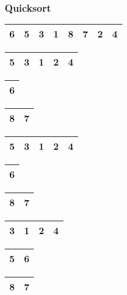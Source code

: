 \begin{frame}
\frametitle{Quicksort}
\begin{table}
\begin{tabular}{| c | c | c | c | c | c | c | c |}
\hline
\cellcolor{red!25}6 & 5 & 3 & 1 & 8 & 7 & 2 & 4 \\ 
\hline
\end{tabular}
\end{table}

\begin{table}
\begin{tabular}{| c | c | c | c | c |}
\hline
5 & 3 & 1 & 2 & 4 \\ 
\hline
\end{tabular}
\quad
\begin{tabular}{| c |}
\hline
\cellcolor{blue!25}6\\ 
\hline
\end{tabular}
\quad
\begin{tabular}{| c | c |}
\hline
8 & 7 \\ 
\hline
\end{tabular}
\end{table}

\begin{table}
\begin{tabular}{| c | c | c | c | c |}
\hline
\cellcolor{red!25}5 & 3 & 1 & 2 & 4 \\ 
\hline
\end{tabular}
\quad
\begin{tabular}{| c |}
\hline
\cellcolor{blue!25}6\\ 
\hline
\end{tabular}
\quad
\begin{tabular}{| c | c |}
\hline
8 & 7 \\ 
\hline
\end{tabular}
\end{table}

\begin{table}
\begin{tabular}{| c | c | c | c |}
\hline
3 & 1 & 2 & 4 \\ 
\hline
\end{tabular}
\quad
\begin{tabular}{| c | c |}
\hline
\cellcolor{blue!25}5 & \cellcolor{blue!25}6\\ 
\hline
\end{tabular}
\quad
\begin{tabular}{| c | c |}
\hline
8 & 7 \\ 
\hline
\end{tabular}
\end{table}
\end{frame}

